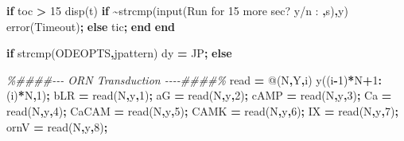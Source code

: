 \documentclass[
]{article}
\newenvironment{Shaded}{\begin{snugshade}}{\end{snugshade}}
\newcommand{\CommentTok}[1]{\textcolor[rgb]{0.56,0.35,0.01}{\textit{#1}}}
\newcommand{\ControlFlowTok}[1]{\textcolor[rgb]{0.13,0.29,0.53}{\textbf{#1}}}
\newcommand{\FloatTok}[1]{\textcolor[rgb]{0.00,0.00,0.81}{#1}}
\newcommand{\FunctionTok}[1]{\textcolor[rgb]{0.00,0.00,0.00}{#1}}
\newcommand{\NormalTok}[1]{#1}
\newcommand{\OperatorTok}[1]{\textcolor[rgb]{0.81,0.36,0.00}{\textbf{#1}}}
\newcommand{\StringTok}[1]{\textcolor[rgb]{0.31,0.60,0.02}{#1}}
\begin{document}
\begin{Shaded}
\begin{Highlighting}[]
    \ControlFlowTok{if} \FunctionTok{toc} \OperatorTok{\textgreater{}} \FloatTok{15}
        \FunctionTok{disp}\NormalTok{(t)}
        \ControlFlowTok{if} \OperatorTok{\textasciitilde{}}\FunctionTok{strcmp}\NormalTok{(}\FunctionTok{input}\NormalTok{(}\StringTok{\textquotesingle{}Run for 15 more sec? y/n : \textquotesingle{}}\OperatorTok{,}\StringTok{\textquotesingle{}s\textquotesingle{}}\NormalTok{)}\OperatorTok{,}\StringTok{\textquotesingle{}y\textquotesingle{}}\NormalTok{)}
            \FunctionTok{error}\NormalTok{(}\StringTok{\textquotesingle{}Timeout\textquotesingle{}}\NormalTok{)}\OperatorTok{;}
        \ControlFlowTok{else} 
            \FunctionTok{tic}\OperatorTok{;}
        \ControlFlowTok{end}
    \ControlFlowTok{end}
    
    \ControlFlowTok{if} \FunctionTok{strcmp}\NormalTok{(ODEOPTS}\OperatorTok{,}\StringTok{\textquotesingle{}jpattern\textquotesingle{}}\NormalTok{)}
\NormalTok{        dy }\OperatorTok{=}\NormalTok{ JP}\OperatorTok{;}
    \ControlFlowTok{else}
 
        \CommentTok{\%\#\#\#\#{-}{-}{-} ORN Transduction {-}{-}{-}{-}\#\#\#\#\%}
\NormalTok{        read }\OperatorTok{=}\NormalTok{ @(N}\OperatorTok{,}\NormalTok{Y}\OperatorTok{,}\FunctionTok{i}\NormalTok{) y((}\FunctionTok{i}\OperatorTok{{-}}\FloatTok{1}\NormalTok{)}\OperatorTok{*}\NormalTok{N}\OperatorTok{+}\FloatTok{1}\OperatorTok{:}\NormalTok{(}\FunctionTok{i}\NormalTok{)}\OperatorTok{*}\NormalTok{N}\OperatorTok{,}\FloatTok{1}\NormalTok{)}\OperatorTok{;}
\NormalTok{        bLR     }\OperatorTok{=}\NormalTok{ read(N}\OperatorTok{,}\NormalTok{y}\OperatorTok{,}\FloatTok{1}\NormalTok{)}\OperatorTok{;}
\NormalTok{        aG      }\OperatorTok{=}\NormalTok{ read(N}\OperatorTok{,}\NormalTok{y}\OperatorTok{,}\FloatTok{2}\NormalTok{)}\OperatorTok{;}
\NormalTok{        cAMP    }\OperatorTok{=}\NormalTok{ read(N}\OperatorTok{,}\NormalTok{y}\OperatorTok{,}\FloatTok{3}\NormalTok{)}\OperatorTok{;}
\NormalTok{        Ca      }\OperatorTok{=}\NormalTok{ read(N}\OperatorTok{,}\NormalTok{y}\OperatorTok{,}\FloatTok{4}\NormalTok{)}\OperatorTok{;}
\NormalTok{        CaCAM   }\OperatorTok{=}\NormalTok{ read(N}\OperatorTok{,}\NormalTok{y}\OperatorTok{,}\FloatTok{5}\NormalTok{)}\OperatorTok{;}
\NormalTok{        CAMK    }\OperatorTok{=}\NormalTok{ read(N}\OperatorTok{,}\NormalTok{y}\OperatorTok{,}\FloatTok{6}\NormalTok{)}\OperatorTok{;}
\NormalTok{        IX      }\OperatorTok{=}\NormalTok{ read(N}\OperatorTok{,}\NormalTok{y}\OperatorTok{,}\FloatTok{7}\NormalTok{)}\OperatorTok{;}
\NormalTok{        ornV    }\OperatorTok{=}\NormalTok{ read(N}\OperatorTok{,}\NormalTok{y}\OperatorTok{,}\FloatTok{8}\NormalTok{)}\OperatorTok{;}  
        

\end{Highlighting}
\end{Shaded}
\end{document}
